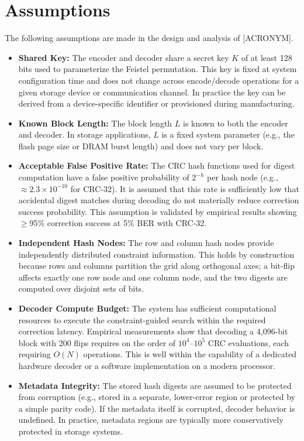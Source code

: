 \section*{Assumptions}
\noindent The following assumptions are made in the design and analysis of [ACRONYM].

\begin{itemize}

    \item \textbf{Shared Key:} The encoder and decoder share a secret key $K$ of at least 128 bits used to parameterize the Feistel permutation. This key is fixed at system configuration time and does not change across encode/decode operations for a given storage device or communication channel. In practice the key can be derived from a device-specific identifier or provisioned during manufacturing.

    \item \textbf{Known Block Length:} The block length $L$ is known to both the encoder and decoder. In storage applications, $L$ is a fixed system parameter (e.g., the flash page size or DRAM burst length) and does not vary per block.

    \item \textbf{Acceptable False Positive Rate:} The CRC hash functions used for digest computation have a false positive probability of $2^{-h}$ per hash node (e.g., $\approx 2.3 \times 10^{-10}$ for CRC-32). It is assumed that this rate is sufficiently low that accidental digest matches during decoding do not materially reduce correction success probability. This assumption is validated by empirical results showing $\geq$95\% correction success at 5\% BER with CRC-32.

    \item \textbf{Independent Hash Nodes:} The row and column hash nodes provide independently distributed constraint information. This holds by construction because rows and columns partition the grid along orthogonal axes; a bit-flip affects exactly one row node and one column node, and the two digests are computed over disjoint sets of bits.

    \item \textbf{Decoder Compute Budget:} The system has sufficient computational resources to execute the constraint-guided search within the required correction latency. Empirical measurements show that decoding a 4,096-bit block with 200 flips requires on the order of $10^4$--$10^5$ CRC evaluations, each requiring $O(N)$ operations. This is well within the capability of a dedicated hardware decoder or a software implementation on a modern processor.

    \item \textbf{Metadata Integrity:} The stored hash digests are assumed to be protected from corruption (e.g., stored in a separate, lower-error region or protected by a simple parity code). If the metadata itself is corrupted, decoder behavior is undefined. In practice, metadata regions are typically more conservatively protected in storage systems.

\end{itemize}
